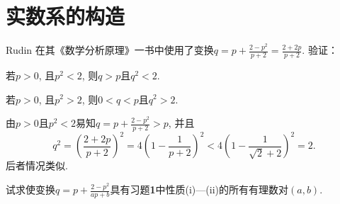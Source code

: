 \section{实数系的构造}
\begin{quiza}
\woe  Rudin 在其《数学分析原理》一书中使用了变换\(q=p+\frac{2-p^2}{p+2}=\frac{2+2p}{p+2}\). 验证：
\begin{compactenum}[(i)]
            \item 若\(p>0\), 且\(p^2<2\), 则\(q>p\)且\(q^2<2\).
            \item 若\(p>0\), 且\(p^2>2\), 则\(0<q<p\)且\(q^2>2\).
\end{compactenum}
\begin{solution}
由\(p>0\)且\(p^2<2\)易知\(q=p+\frac{2-p^2}{p+2}>p\), 并且\[q^2=\left(\frac{2+2p}{p+2}\right)^2=4\left(1-\frac{1}{p+2}\right)^2<4\left(1-\frac{1}{\sqrt{2}+2}\right)^2=2.\]后者情况类似.
\end{solution}
\woe 试求使变换\(q=p+\frac{2-p^2}{ap+b}\)具有习题\textbf{1}中性质(i)---(ii)的所有有理数对\((a,b)\).
\begin{solution}


\end{solution}
\end{quiza}
